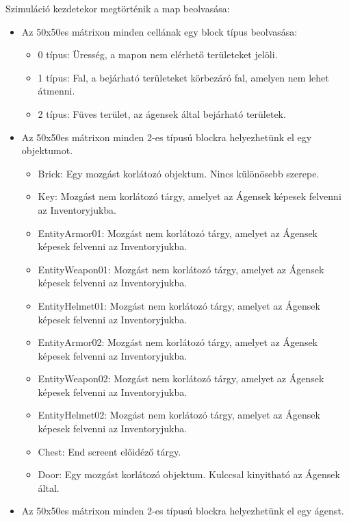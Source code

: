 Szimuláció kezdetekor megtörténik a map beolvasása:

\begin{itemize}
    \item Az 50x50es mátrixon minden cellának egy block típus beolvasása:
    
    \begin{itemize}
        \item 0 típus: Üresség, a mapon nem elérhető területeket jelöli.
        \item 1 típus: Fal, a bejárható területeket körbezáró fal, amelyen nem lehet átmenni.
        \item 2 típus: Füves terület, az ágensek által bejárható területek.
    \end{itemize}

    \item Az 50x50es mátrixon minden 2-es típusú blockra helyezhetünk el egy objektumot.
    
    \begin{itemize}
        \item Brick: Egy mozgást korlátozó objektum. Nincs különösebb szerepe.
        \item Key: Mozgást nem korlátozó tárgy, amelyet az Ágensek képesek felvenni az Inventoryjukba.
        \item EntityArmor01: Mozgást nem korlátozó tárgy, amelyet az Ágensek képesek felvenni az Inventoryjukba.
        \item EntityWeapon01: Mozgást nem korlátozó tárgy, amelyet az Ágensek képesek felvenni az Inventoryjukba.
        \item EntityHelmet01: Mozgást nem korlátozó tárgy, amelyet az Ágensek képesek felvenni az Inventoryjukba.
        \item EntityArmor02: Mozgást nem korlátozó tárgy, amelyet az Ágensek képesek felvenni az Inventoryjukba.
        \item EntityWeapon02: Mozgást nem korlátozó tárgy, amelyet az Ágensek képesek felvenni az Inventoryjukba.
        \item EntityHelmet02: Mozgást nem korlátozó tárgy, amelyet az Ágensek képesek felvenni az Inventoryjukba.
        \item Chest: End screent előidéző tárgy.
        \item Door: Egy mozgást korlátozó objektum. Kulccsal kinyitható az Ágensek által.
    \end{itemize}

    \item Az 50x50es mátrixon minden 2-es típusú blockra helyezhetünk el egy ágenst.
    

\end{itemize}
